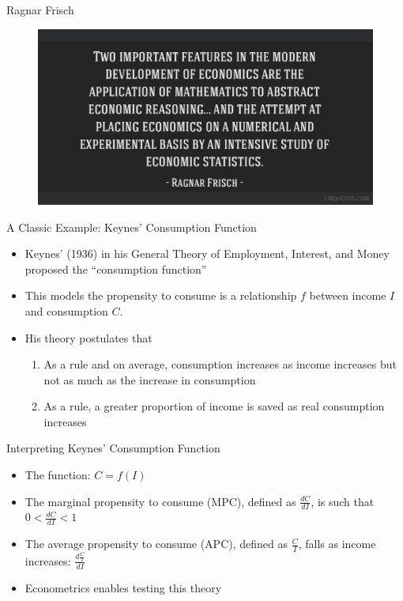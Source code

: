 \documentclass[static]{JJH-Beamer}
\begin{document}
\begin{frame}{Ragnar Frisch}
\begin{figure}[H]
\centering
\includegraphics[width=.85\columnwidth]{frisch1}
\end{figure}
\end{frame} 

\begin{frame}{A Classic Example: Keynes' Consumption Function}
	\begin{itemize}
		\item Keynes' (1936) in his General Theory of Employment, Interest, and Money proposed the ``consumption function''
		\bigskip
		\item  This models the propensity to consume is a relationship $f$ between income $I$ and consumption $C$. 
		\bigskip
		\item His theory postulates that 
			\begin{enumerate}
				\item As a rule and on average, consumption increases as income increases but not as much as the increase in consumption
				\item As a rule, a greater proportion of income is saved as real consumption increases
			\end{enumerate}
	\end{itemize}
\end{frame}
 
\begin{frame}{Interpreting Keynes' Consumption Function}
	\begin{itemize}
		\item The function: $C = f (I)$
		\bigskip
		\item The marginal propensity to consume (MPC), defined as $\frac{dC}{dI}$, is such that $0 < \frac{dC}{dI} < 1$
		\bigskip
		\item The average propensity to consume (APC), defined as $\frac{C}{I}$, falls as income increases: $\frac{d \frac{C}{I} }{d I}$
		\bigskip
		\item Econometrics enables testing this theory
	\end{itemize}
\end{frame}
\end{document}
